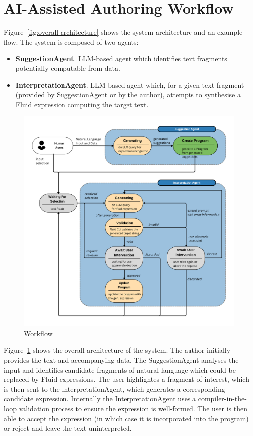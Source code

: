 \section{AI-Assisted Authoring Workflow}
\label{sec:authoring-workflow}

Figure~\ref{fig:overall-architecture} shows the system architecture and an example flow.
The system is composed of two agents:

\begin{itemize}
    \item \textbf{SuggestionAgent}. LLM-based agent which identifies text fragments potentially computable from data.
    \item \textbf{InterpretationAgent}. LLM-based agent which, for a given text fragment (provided by
    SuggestionAgent or by the author), attempts to synthesise a Fluid expression computing the target text.
\end{itemize}

\begin{figure}
    \centering
    \includegraphics[width=\linewidth]{fig/entire-workflow}
    \caption{Workflow}\label{fig:architecture}
\end{figure}

Figure~\ref{fig:architecture} shows the overall architecture of the system.
The author initially provides the text and accompanying data.
The SuggestionAgent analyses the input and identifies candidate fragments of natural language which could be replaced by Fluid expressions.
The user highlightes a fragment of interest, which is then sent to the InterpretationAgent, which generates a corresponding candidate expression.
Internally the InterpretationAgent uses a compiler-in-the-loop validation process to ensure the expression is well-formed.
The user is then able to accept the expression (in which case it is incorporated into the program) or reject and leave the text uninterpreted.

